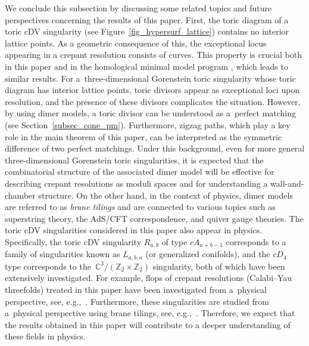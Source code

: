 \documentclass[pdftex]{sigma}
\numberwithin{equation}{section}
\theoremstyle{definition}
\newcommand{\ZZ}{\mathbb{Z}}
\newcommand{\CC}{\mathbb{C}}
\begin{document}
We conclude this subsection by discussing some related topics and future perspectives concerning the results of this paper.
First, the toric diagram of a toric cDV singularity (see Figure~\ref{fig_hypersurf_lattice}) contains no interior lattice points.
As a geometric consequence of this, the exceptional locus appearing in a crepant resolution consists of curves.
This property is crucial both in this paper and in the homological minimal model program \cite{Wem_MMP}, which leads to similar results.
For a~three-dimensional Gorenstein toric singularity whose toric diagram has interior lattice points, toric divisors appear as exceptional loci upon resolution,
and the presence of these divisors complicates the situation.
However, by using dimer models, a toric divisor can be understood as a~perfect matching (see Section~\ref{subsec_cone_pm}).
Furthermore, zigzag paths, which play a key role in the main theorem of this paper, can be interpreted as the symmetric difference of two perfect matchings.
Under this background, even for more general three-dimensional Gorenstein toric singularities, it is expected that the combinatorial structure of the associated dimer model will be effective for describing crepant resolutions as moduli spaces and for understanding a wall-and-chamber structure.
On the other hand, in the context of physics, dimer models are referred to as \emph{brane tilings} and are connected to various topics such as superstring theory,
the AdS/CFT correspondence, and quiver gauge theories.
The toric cDV singularities considered in this paper also appear in physics.
Specifically, the toric cDV singularity $R_{a,b}$ of type $cA_{a+b-1}$ corresponds to a family of singularities known as $L_{a,b,a}$ (or generalized conifolds),
and the $cD_4$ type corresponds to the~$\CC^3/(\ZZ_2\times \ZZ_2)$ singularity, both of which have been extensively investigated.
For example, flops of crepant resolutions (Calabi--Yau threefolds) treated in this paper have been investigated from a~physical perspective, see, e.g.,~\cite{ura_brane}.
Furthermore, these singularities are studied from a~physical perspective using brane tilings, see, e.g.,~\cite{fra_etal_gauge}.
Therefore, we expect that the results obtained in this paper will contribute to a deeper understanding of these fields in physics.
\end{document}
